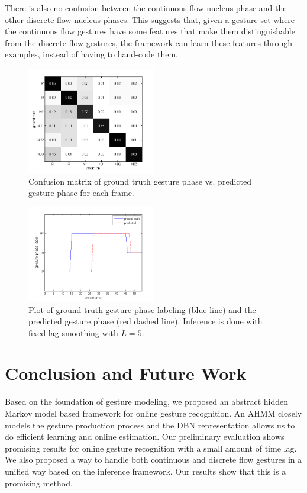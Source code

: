 \documentclass[10pt,twocolumn,letterpaper]{article}
\begin{document}
There is also no confusion between the continuous flow nucleus phase and the other discrete flow
nucleus phases. This suggests that, given a gesture set where the continuous flow gestures
have some features that make them distinguishable from the discrete flow gestures, the framework
can learn these features through examples, instead of having to hand-code them. 

\begin{figure}[tb]
\begin{center}
\includegraphics[width=0.5\textwidth]{figure/confusion-matrix.png}
\end{center}
   \caption{Confusion matrix of ground truth gesture phase vs.
   predicted gesture phase for each frame. }
\label{fig:confusion-matrix}
\end{figure}

\begin{figure}[tb]
\begin{center}
\includegraphics[width=0.5\textwidth]{figure/segmentation.png}
\end{center}
   \caption{Plot of ground truth gesture phase labeling (blue line) and the predicted gesture phase (red dashed line).
   Inference is done with fixed-lag smoothing with $L = 5$.}
\label{fig:gesture-phase}
\end{figure}
  
\section{Conclusion and Future Work}
Based on the foundation of gesture modeling, we proposed an abstract hidden Markov model
based framework for online gesture recognition. An AHMM closely models the gesture production process
and the DBN representation allows us to do efficient learning and online estimation. 
Our preliminary evaluation shows promising results for online gesture recognition
with a small amount of time lag. We also proposed a way to handle both continuous and discrete flow gestures in a unified
way based on the inference framework. Our results show that this is a promising method. 
\end{document}
